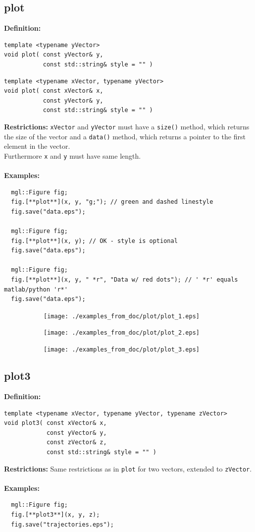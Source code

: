 \documentclass[a4paper]{article}
\newcommand{\command}[1]{\subsection{#1}}
\begin{document}
\command{plot} 

\textbf{Definition:} 
\begin{lstlisting}
template <typename yVector>
void plot( const yVector& y, 
           const std::string& style = "" )
\end{lstlisting}

\begin{lstlisting}
template <typename xVector, typename yVector>
void plot( const xVector& x, 
           const yVector& y, 
           const std::string& style = "" )
\end{lstlisting}
\textbf{Restrictions:} \texttt{xVector} and \texttt{yVector} must have a \texttt{size()} method, which returns the size of the vector 
and a \texttt{data()} method, which returns a pointer to the first element in the vector. \\
Furthermore \texttt{x} and \texttt{y} must have same length. \\ \\
%
\textbf{Examples:}
\begin{lstlisting}
  mgl::Figure fig;
  fig.[**plot**](x, y, "g;"); // green and dashed linestyle
  fig.save("data.eps");

  mgl::Figure fig;
  fig.[**plot**](x, y); // OK - style is optional
  fig.save("data.eps");

  mgl::Figure fig;
  fig.[**plot**](x, y, " *r", "Data w/ red dots"); // ' *r' equals matlab/python 'r*'
  fig.save("data.eps");
\end{lstlisting}

\begin{figure}[h]
  \centering
  \begin{subfigure}[hb]{.32\linewidth}
    \texttt{[image: ./examples\_from\_doc/plot/plot\_1.eps]}
  \end{subfigure}
    \hfill
  \begin{subfigure}[hb]{.32\linewidth}
    \texttt{[image: ./examples\_from\_doc/plot/plot\_2.eps]}
  \end{subfigure}
    \hfill
  \begin{subfigure}[hb]{.32\linewidth}
    \texttt{[image: ./examples\_from\_doc/plot/plot\_3.eps]}
  \end{subfigure}
\end{figure}


\command{plot3}

\textbf{Definition:}
\begin{lstlisting}
template <typename xVector, typename yVector, typename zVector>
void plot3( const xVector& x,
            const yVector& y,
            const zVector& z,
            const std::string& style = "" )
\end{lstlisting}
\textbf{Restrictions:} Same restrictions as in \texttt{plot} for two vectors, extended to \texttt{zVector}. \\ \\
%
\textbf{Examples:}
\begin{lstlisting}
  mgl::Figure fig;
  fig.[**plot3**](x, y, z);
  fig.save("trajectories.eps");
\end{lstlisting}
\end{document}
